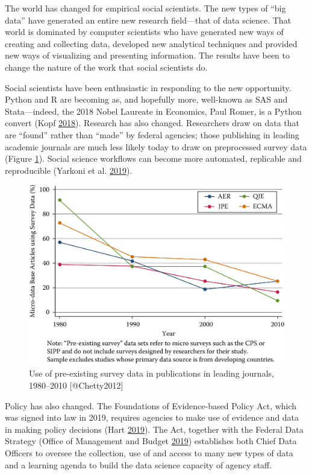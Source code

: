 \documentclass[]{krantz}
\begin{document}
The world has changed for empirical social scientists. The new types of
``big data'' have generated an entire new research field---that of data
science. That world is dominated by computer scientists who have
generated new ways of creating and collecting data, developed new
analytical techniques and provided new ways of visualizing and
presenting information. The results have been to change the nature of
the work that social scientists do.

Social scientists have been enthusiastic in responding to the new
opportunity. Python and R are becoming as, and hopefully more,
well-known as SAS and Stata---indeed, the 2018 Nobel Laureate in
Economics, Paul Romer, is a Python convert (Kopf
\protect\hyperlink{ref-Kopf}{2018}). Research has also changed.
Researchers draw on data that are ``found'' rather than ``made'' by
federal agencies; those publishing in leading academic journals are much
less likely today to draw on preprocessed survey data (Figure
\ref{fig:fig1}). Social science workflows can become more automated,
replicable and reproducible (Yarkoni et al.
\protect\hyperlink{ref-Yarkoni2019}{2019}).

\begin{figure}

{\centering \includegraphics[width=0.7\linewidth]{ChapterIntro/figures/Figure1} 

}

\caption{Use of pre-existing survey data in publications in leading journals, 1980--2010 [@Chetty2012]}\label{fig:fig1}
\end{figure}

Policy has also changed. The Foundations of Evidence-based Policy Act,
which was signed into law in 2019, requires agencies to make use of
evidence and data in making policy decisions (Hart
\protect\hyperlink{ref-Hart}{2019}). The Act, together with the Federal
Data Strategy (Office of Management and Budget
\protect\hyperlink{ref-OfficeofManagementandBudget}{2019}) establishes
both Chief Data Officers to oversee the collection, use of and access to
many new types of data and a learning agenda to build the data science
capacity of agency staff.
\end{document}
